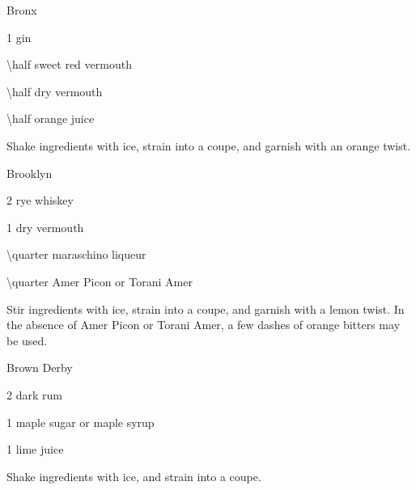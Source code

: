 \begin{Cocktail}{Bronx}
  \begin{Ingredients}
  \item \SI{1}{\oz} gin
  \item \SI{\half}{\oz} sweet red vermouth
  \item \SI{\half}{\oz} dry vermouth
  \item \SI{\half}{\oz} orange juice
  \end{Ingredients}
  
  \begin{Instructions}
	Shake ingredients with ice, strain into a coupe, and garnish with an orange twist.
  \end{Instructions}
\end{Cocktail}

\begin{Cocktail}{Brooklyn}
  \begin{Ingredients}
  \item \SI{2}{\oz} rye whiskey
  \item \SI{1}{\oz} dry vermouth
  \item \SI{\quarter}{\oz} maraschino liqueur
  \item \SI{\quarter}{\oz} Amer Picon or Torani Amer
  \end{Ingredients}
  
  \begin{Instructions}
	Stir ingredients with ice, strain into a coupe, and garnish with a lemon twist.  In the absence of Amer Picon or Torani Amer, a few dashes of orange bitters may be used.
  \end{Instructions}
\end{Cocktail}

\begin{Cocktail}{Brown Derby}
  \begin{Ingredients}
  \item \SI{2}{\oz} dark rum
  \item \SI{1}{\tsp} maple sugar or maple syrup
  \item \SI{1}{\oz} lime juice
  \end{Ingredients}
  
  \begin{Instructions}
	Shake ingredients with ice, and strain into a coupe.
  \end{Instructions}
\end{Cocktail}


